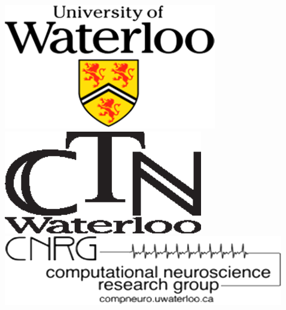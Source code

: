 \documentclass[final]{beamer}
\begin{document}
\begin{frame}[t]
\begin{columns}
\begin{column}{\paperwidth-339mm}
\begin{center}
                \vspace*{10mm}
                \insertauthor\par\insertinstitute%
            \end{center}
        \end{column}
        \begin{column}{190mm}
            \centering
            \includegraphics[width=92.8mm]{uw_bow}\hfill
            \includegraphics[width=86.8mm]{CTN_logo}\\\vspace*{10mm}
            \includegraphics[width=187.7mm]{CNRG_BoW}
        \end{column}
        \begin{column}{20mm}
        \end{column}
    \end{columns}
    \vspace*{20mm}


\end{frame}
\end{document}
